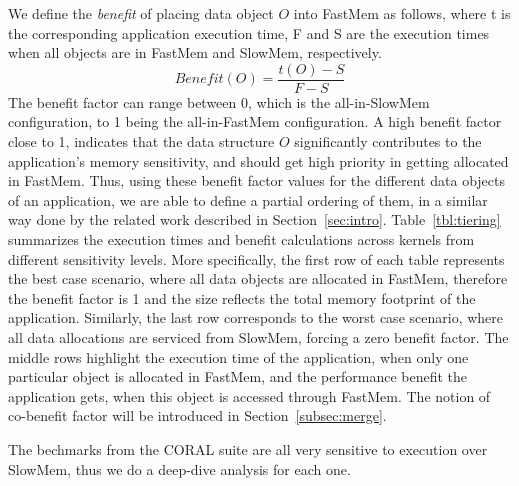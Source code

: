 We define the {\em benefit} of placing data object $O$ into FastMem as follows, where t is the corresponding application execution time, F and S are the execution times when all objects are in FastMem and SlowMem, respectively.
\[Benefit(O) = \frac{t(O)-S}{F-S}\]
The benefit factor can range between 0, which is the all-in-SlowMem configuration, to 1 being the all-in-FastMem configuration.
A high benefit factor close to 1, indicates that the data structure $O$
significantly contributes to the application's memory sensitivity, and
should get high priority in getting allocated in FastMem. Thus, using these benefit factor values for the different data objects of an
application, we are able to define a partial ordering of them, in a
similar way done by the related work described in Section~\ref{sec:intro}. Table~\ref{tbl:tiering} summarizes the execution times and benefit calculations across kernels  
from different sensitivity levels. 
More specifically, the first row of each table represents the best case scenario, where all data objects are allocated in FastMem, therefore the benefit factor is 1 and the size reflects the total 
memory footprint of the application. Similarly, the last row corresponds to the worst case scenario, where all data allocations are serviced from SlowMem, forcing a zero benefit factor. The middle rows 
highlight the execution time of the application, when only one particular object is allocated in FastMem, and the performance benefit the application gets, when this object is accessed through FastMem. 
The notion of co-benefit factor will be introduced in Section~\ref{subsec:merge}.\\

\vspace{0.6ex}
\vspace{0.3ex} 

\noindent The bechmarks from the CORAL suite are all very sensitive to execution over SlowMem, thus we do a deep-dive analysis for each one.\\

